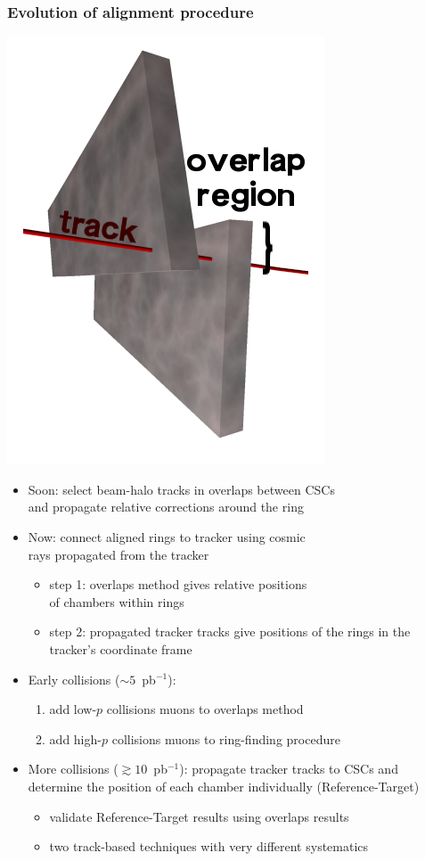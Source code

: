 \documentclass[compress]{beamer}
\begin{document}
\begin{frame}
\frametitle{Evolution of alignment procedure}

\vspace{0.5 cm}
\hfill \includegraphics[width=2 cm]{overlaps.png}

\vspace{-3.3 cm}
\begin{itemize}
\item Soon: select beam-halo tracks in overlaps between CSCs \\ and propagate relative corrections around the ring

\item Now: connect aligned rings to tracker using cosmic \\ rays propagated from the tracker

\begin{itemize}
\item step 1: overlaps method gives relative positions \\ of chambers within rings

\item step 2: propagated tracker tracks give positions of the rings in the tracker's coordinate frame
\end{itemize}

\item Early collisions ($\sim 5$~pb$^{-1}$):
\begin{enumerate}
\item add low-$p$ collisions muons to overlaps method
\item add high-$p$ collisions muons to ring-finding procedure
\end{enumerate}

\item More collisions ($\gtrsim 10$~pb$^{-1}$): propagate tracker
  tracks to CSCs and determine the position of each chamber individually
  \mbox{(Reference-Target)\hspace{-1 cm}}
\begin{itemize}
\item validate Reference-Target results using overlaps results
\item two track-based techniques with very different systematics
\end{itemize}

\end{itemize}
\end{frame}
\end{document}

